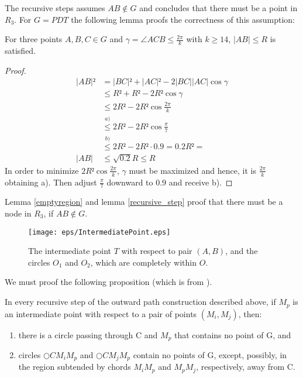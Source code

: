 The recursive steps assumes $AB \notin G $ and concludes that there must be a point in $R_3 $.
For $G=PDT $ the following lemma proofs the correctness of this assumption:
\begin{lemma}
\label{recursive_step}
For three points $A, B, C \in G $ and $\gamma=\angle{ACB}\leq \frac{2\pi}{k} $ with $k\geq 14 $, $|AB|\leq R $ is satisfied.
\end{lemma} 
\begin{proof}

\begin{equation*}
\begin{split}
  |AB|² &=|BC|²+|AC|² - 2|BC||AC|\cos{\gamma} \\
  &\leq R²+R²   - 2R²\cos{\gamma} \\
  &\leq 2R² - 2R²\cos{\frac{2\pi}{k}}\\
  &\stackrel{a)}{\leq} 2R² - 2R²\cos{\frac{\pi}{7}}\\
  &\stackrel{b)}{\leq} 2R² - 2R²\cdot 0.9 = 0.2R²=\\
  |AB| &\leq \sqrt{0.2} R \leq R
\end{split}
\end{equation*}
In order to minimize $2R²\cos{\frac{2\pi}{k}} $, $\gamma $ must be maximized and hence, it is $\frac{2\pi}{k} $ obtaining a).
Then adjust $\frac{\pi}{7} $ downward to $0.9 $ and receive b).
 
\end{proof}

Lemma \ref{emptyregion} and lemma \ref{recursive_step} proof that there must be a node in $R_3 $, if $AB \notin G $.



\begin{figure}[h!]
\centering
\texttt{[image: eps/IntermediatePoint.eps]}
\caption{The intermediate point $T $ with respect to pair $(A,B) $, and the circles $O_1 $ and $O_2 $, which are completely within $O $. }
\label{fig:intermediate_point}
\end{figure}


We must proof the following proposition (which is from \cite{kanj}).

\begin{prop}
\label{outward_path}
In every recursive step of the outward path construction described above, if $M_p $ is an intermediate point with respect to a pair of points $(M_i, M_j) $, then:
\begin{enumerate}
\renewcommand{\labelenumi}{\alph{enumi})}
\item there is a circle passing through C and $M_p $ that contains no point of G, and
\item circles $\bigcirc{CM_iM_p} $ and $\bigcirc{CM_jM_p} $ contain no points of G, except, possibly, in the region subtended by chords $M_iM_p $ and $M_pM_j $, respectively, away from C.
\end{enumerate}
\end{prop}

